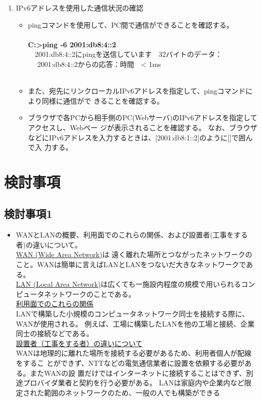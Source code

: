 \documentclass[10pt]{article}
\begin{document}
\begin{enumerate}
                \endgroup
    \item IPv6アドレスを使用した通信状況の確認
        \begin{itemize}
            \item pingコマンドを使用して、PC間で通信ができることを確認する。\\\\
                  \textbf{C:>ping -6 2001:db8:4::2} \\
                　2001:db8:4::2にpingを送信しています　32バイトのデータ：\\
　                2001:db8:4::2からの応答：時間　< 1ms \\
　          \item また、宛先にリンクローカルIPv6アドレスを指定して、pingコマンドにより同様に通信がで
                    きることを確認する。 
            \item ブラウザで各PCから相手側のPC(Webサーバ)のIPv6アドレスを指定してアクセスし、Webペー
                    ジが表示されることを確認する。
                なお、ブラウザなどにIPv6アドレスを入力するときは、[2001:db8:1::2]のように[]で囲んで入
                力する。
            
        \end{itemize}
\end{enumerate}

\section{検討事項}

\subsection{検討事項1}
\begin{itemize}
    \item WANとLANの概要、利用面でのこれらの関係、および設置者(工事をする者)の違いについて。\\
    \underline{WAN (Wide Area Network)}は 遠く離れた場所とつながったネットワークのこと。WANは簡単に言えばLANとLANをつないだ大きなネットワークである。\\
    \underline{LAN (Local Area Network)}は広くても一施設内程度の規模で用いられるコンピュータネットワークのことである。 \\
    \underline{利用面でのこれらの関係}\\ LANで構築した小規模のコンピュータネットワーク同士を接続する際に、WANが使用される。 例えば、工場に構築したLANを他の工場と接続、企業同士の接続などである。 \\
    \underline{設置者（工事をする者）の違いについて }\\
    WANは地理的に離れた場所を接続する必要があるため、利用者個人が配線をするこ とができず、NTTなどの電気通信業者に設置を依頼する必要がある。またWANの設 置だけではインターネットに接続することはできず、別途プロバイダ業者と契約を行う必要がある。 
    LANは家庭内や企業内など限定された範囲のネットワークのため、一般の人でも構築ができる
\end{itemize}
\end{document}
